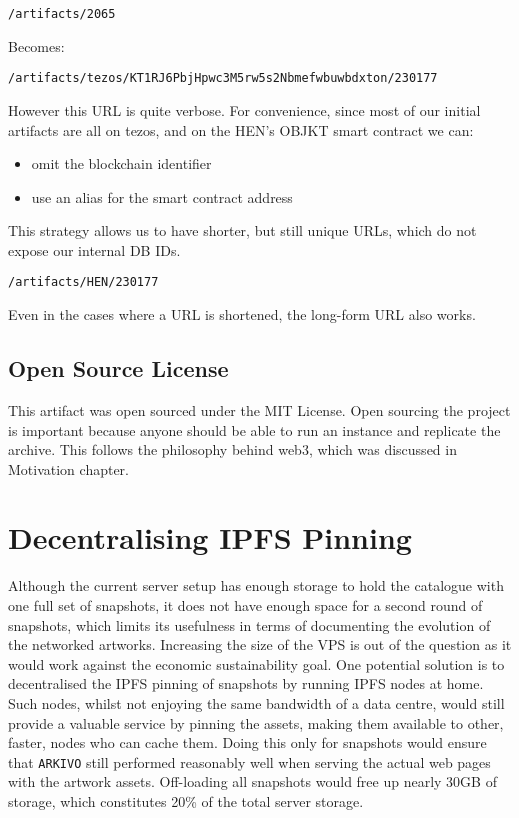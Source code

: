 \texttt{/artifacts/2065}

Becomes:

\texttt{/artifacts/tezos/KT1RJ6PbjHpwc3M5rw5s2Nbmefwbuwbdxton/230177}


However this URL is quite verbose. For convenience, since most of our initial artifacts are all on tezos, and on the HEN's OBJKT smart contract we can:

\begin{itemize}
    \item omit the blockchain identifier
    \item use an alias for the smart contract address
\end{itemize}

This strategy allows us to have shorter, but still unique URLs, which do not expose our internal DB IDs.

\texttt{/artifacts/HEN/230177}

Even in the cases where a URL is shortened, the long-form URL also works.

\subsection{Open Source License}

This artifact was open sourced under the MIT License.
Open sourcing the project is important because anyone should be able to run an instance and replicate the archive. This follows the philosophy behind web3, which was discussed in Motivation chapter.

\section{Decentralising IPFS Pinning}

Although the current server setup has enough storage to hold the catalogue with one full set of snapshots, it does not have enough space for a second round of snapshots, which limits its usefulness in terms of documenting the evolution of the networked artworks. Increasing the size of the VPS is out of the question as it would work against the economic sustainability goal.
One potential solution is to decentralised the IPFS pinning of snapshots by running IPFS nodes at home. Such nodes, whilst not enjoying the same bandwidth of a data centre, would still provide a valuable service by pinning the assets, making them available to other, faster, nodes who can cache them. Doing this only for snapshots would ensure that \texttt{ARKIVO} still performed reasonably well when serving the actual web pages with the artwork assets. Off-loading all snapshots would free up nearly 30GB of storage, which constitutes 20\% of the total server storage.

